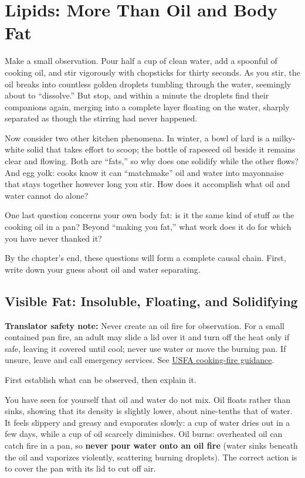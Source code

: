 \chapter{Lipids: More Than Oil and Body Fat}

\begin{kaichang}
Make a small observation. Pour half a cup of clean water, add a spoonful of cooking oil, and stir vigorously with chopsticks for thirty seconds. As you stir, the oil breaks into countless golden droplets tumbling through the water, seemingly about to ``dissolve.'' But stop, and within a minute the droplets find their companions again, merging into a complete layer floating on the water, sharply separated as though the stirring had never happened.

Now consider two other kitchen phenomena. In winter, a bowl of lard is a milky-white solid that takes effort to scoop; the bottle of rapeseed oil beside it remains clear and flowing. Both are ``fats,'' so why does one solidify while the other flows? And egg yolk: cooks know it can ``matchmake'' oil and water into mayonnaise that stays together however long you stir. How does it accomplish what oil and water cannot do alone?

One last question concerns your own body fat: is it the same kind of stuff as the cooking oil in a pan? Beyond ``making you fat,'' what work does it do for which you have never thanked it?

By the chapter's end, these questions will form a complete causal chain. First, write down your guess about oil and water separating.
\end{kaichang}

\section{Visible Fat: Insoluble, Floating, and Solidifying}

\textbf{Translator safety note:} Never create an oil fire for observation. For a small contained pan fire, an adult may slide a lid over it and turn off the heat only if safe, leaving it covered until cool; never use water or move the burning pan. If unsure, leave and call emergency services. See \href{https://www.usfa.fema.gov/prevention/home-fires/prevent-fires/cooking/}{USFA cooking-fire guidance}.

First establish what can be observed, then explain it.

You have seen for yourself that oil and water do not mix. Oil floats rather than sinks, showing that its density is slightly lower, about nine-tenths that of water. It feels slippery and greasy and evaporates slowly: a cup of water dries out in a few days, while a cup of oil scarcely diminishes. Oil burns: overheated oil can catch fire in a pan, so \textbf{never pour water onto an oil fire} (water sinks beneath the oil and vaporizes violently, scattering burning droplets). The correct action is to cover the pan with its lid to cut off air.

